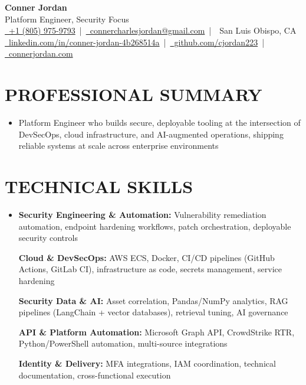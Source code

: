 \documentclass[letterpaper,10pt]{article}
\newcommand{\resumeSubHeadingListStart}{\begin{itemize}[leftmargin=0in,label={}]}
\newcommand{\resumeSubHeadingListEnd}{\end{itemize}}
\begin{document}
\begin{center}
  {\Huge \textbf{Conner Jordan}}\\[0pt]
  {\Large Platform Engineer, Security Focus}\\[0pt]
  \href{tel:+18059759793}{\faPhone\ +1 (805) 975-9793} \,|\, 
  \href{mailto:connercharlesjordan@gmail.com}{\faEnvelope\ connercharlesjordan@gmail.com} \,|\, 
  \faMapMarker\ San Luis Obispo, CA \\[-2pt]
  \href{https://www.linkedin.com/in/conner-jordan-4b268514a/}{\faLinkedin\ linkedin.com/in/conner-jordan-4b268514a}
  \,|\, \href{https://github.com/cjordan223}{\faGithub\ github.com/cjordan223}
  \,|\, \href{https://connerjordan.com/}{\faGlobe\ connerjordan.com}
\end{center}

\vspace{4pt}

\section{PROFESSIONAL SUMMARY}
\vspace{8pt}
\resumeSubHeadingListStart
\item {\small
Platform Engineer who builds secure, deployable tooling at the intersection of DevSecOps, cloud infrastructure, and AI-augmented operations, shipping reliable systems at scale across enterprise environments}
\resumeSubHeadingListEnd
\vspace{6pt}

\section{TECHNICAL SKILLS}
\vspace{6pt}
\resumeSubHeadingListStart
\item {\small
\textbf{Security Engineering \& Automation:} Vulnerability remediation automation, endpoint hardening workflows, patch orchestration, deployable security controls

\vspace{3pt}
\textbf{Cloud \& DevSecOps:} AWS ECS, Docker, CI/CD pipelines (GitHub Actions, GitLab CI), infrastructure as code, secrets management, service hardening

\vspace{3pt}
\textbf{Security Data \& AI:} Asset correlation, Pandas/NumPy analytics, RAG pipelines (LangChain + vector databases), retrieval tuning, AI governance

\vspace{3pt}
\textbf{API \& Platform Automation:} Microsoft Graph API, CrowdStrike RTR, Python/PowerShell automation, multi-source integrations

\vspace{3pt}
\textbf{Identity \& Delivery:} MFA integrations, IAM coordination, technical documentation, cross-functional execution
}
\resumeSubHeadingListEnd
\vspace{6pt}
\end{document}
